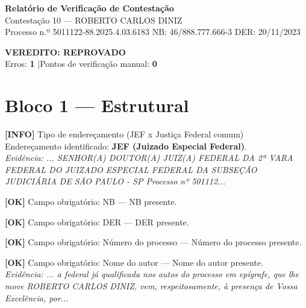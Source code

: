 \documentclass[12pt,a4paper]{article}
\newcommand{\statusOK}[1]{\textcolor{corOK}{\textbf{[OK]}} #1}
\newcommand{\statusINFO}[1]{\textcolor{corINFO}{\textbf{[INFO]}} #1}
\begin{document}
\begin{center}
  {\LARGE \textbf{Relatório de Verificação de Contestação}}\\[0.4em]
  {\large Contestação 10 --- ROBERTO CARLOS DINIZ}\\[0.2em]
  {\small Processo n.º 5011122-88.2025.4.03.6183 \quad NB: 46/888.777.666-3 \quad DER: 20/11/2023}
\end{center}

\vspace{0.5em}

\noindent\colorbox{corFundoReprovado}{%
  \begin{minipage}{\dimexpr\linewidth-2\fboxsep}
    \centering
    \vspace{0.3em}
    {\large \textcolor{corERRO}{\textbf{VEREDITO: REPROVADO}}}\\
    Erros: \textbf{1} \quad|\quad Pontos de verificação manual: \textbf{0}
    \vspace{0.3em}
  \end{minipage}%
}

\vspace{1em}


\section{Bloco 1 --- Estrutural}

\statusINFO{Tipo de endereçamento (JEF x Justiça Federal comum)}\\
Endereçamento identificado: \textbf{JEF (Juizado Especial Federal)}.\\
\textit{Evidência: ... SENHOR(A) DOUTOR(A) JUIZ(A) FEDERAL DA 2ª VARA FEDERAL DO JUIZADO ESPECIAL FEDERAL DA SUBSEÇÃO JUDICIÁRIA DE SÃO PAULO - SP Processo nº 501112...}

\medskip
\statusOK{Campo obrigatório: NB} --- NB presente.

\medskip
\statusOK{Campo obrigatório: DER} --- DER presente.

\medskip
\statusOK{Campo obrigatório: Número do processo} --- Número do processo presente.

\medskip
\statusOK{Campo obrigatório: Nome do autor} --- Nome do autor presente.\\
\textit{Evidência: ... a federal já qualificada nos autos do processo em epígrafe, que lhe move ROBERTO CARLOS DINIZ, vem, respeitosamente, à presença de Vossa Excelência, por...}
\end{document}
